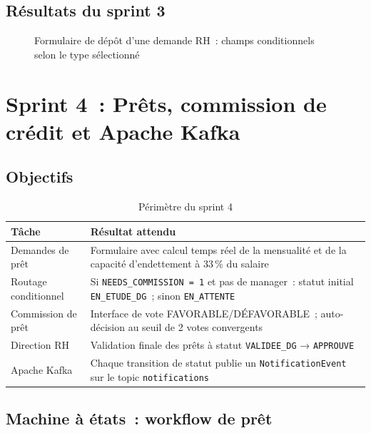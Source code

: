 \subsection{Résultats du sprint 3}

\begin{figure}[H]
  \centering
  \caption{Formulaire de dépôt d'une demande RH~: champs conditionnels selon le type sélectionné}
  \label{fig:s3_form}
\end{figure}

\section{Sprint 4~: Prêts, commission de crédit et Apache Kafka}

\subsection{Objectifs}

\begin{table}[H]
\centering
\caption{Périmètre du sprint 4}
\label{tab:s4}
\begin{tabularx}{\textwidth}{|l|L|}
\hline
{}\textbf{Tâche} & \textbf{Résultat attendu} \\\hline
{}
Demandes de prêt & Formulaire avec calcul temps réel de la mensualité et
  de la capacité d'endettement à 33\,\% du salaire \\\hline
Routage conditionnel & Si \texttt{NEEDS\_COMMISSION = 1} et pas de manager~:
  statut initial \texttt{EN\_ETUDE\_DG}~; sinon \texttt{EN\_ATTENTE} \\\hline
{}
Commission de prêt & Interface de vote FAVORABLE/DÉFAVORABLE~;
  auto-décision au seuil de 2 votes convergents \\\hline
Direction RH & Validation finale des prêts à statut \texttt{VALIDEE\_DG} → \texttt{APPROUVE} \\\hline
{}
Apache Kafka & Chaque transition de statut publie un \texttt{NotificationEvent}
  sur le topic \texttt{notifications} \\\hline
\end{tabularx}
\end{table}

\subsection{Machine à états~: workflow de prêt}

